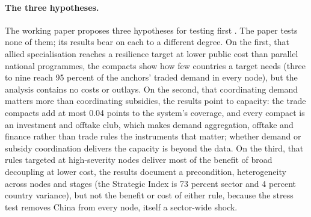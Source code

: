 \paragraph{The three hypotheses.} The working paper proposes three hypotheses for testing first
\citep{neis2026allied}. The paper tests none of them; its results bear on each to a different
degree. On the first, that allied specialisation reaches a resilience target at lower public cost
than parallel national programmes, the compacts show how few countries a target needs (three to nine
reach 95 percent of the anchors' traded demand in every node), but the analysis contains no costs or
outlays. On the second, that coordinating demand matters more than coordinating subsidies, the results
point to capacity: the trade compacts add at most 0.04 points to the system's coverage, and every
compact is an investment and offtake club, which makes demand aggregation, offtake and finance rather
than trade rules the instruments that matter; whether demand or subsidy coordination delivers the
capacity is beyond the data. On the third, that rules targeted at high-severity nodes deliver most of
the benefit of broad decoupling at lower cost, the results document a precondition, heterogeneity
across nodes and stages (the Strategic Index is 73 percent sector and 4 percent country variance), but
not the benefit or cost of either rule, because the stress test removes China from every node, itself a
sector-wide shock.

